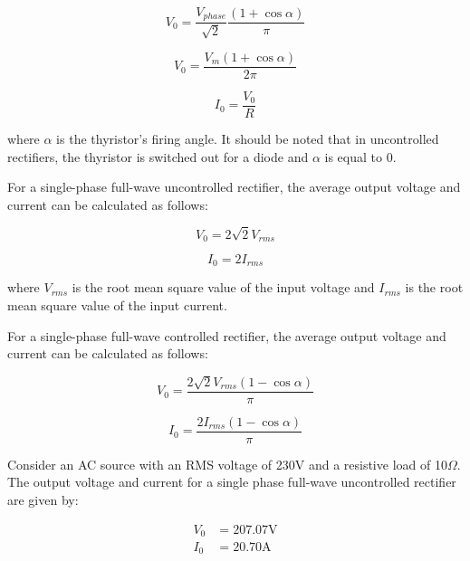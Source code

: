 \begin{equation}
    V_0 = \frac{V_{phase}}{\sqrt{2}}\frac{(1+\cos\alpha)}{\pi}
\end{equation}

\begin{equation}
    V_0 = \frac{V_m(1+\cos\alpha)}{2\pi}
\end{equation}

\begin{equation}
    I_0 = \frac{V_0}{R}
\end{equation}

where $\alpha$ is the thyristor's firing angle. It should be noted that in uncontrolled rectifiers, the thyristor is switched out for a diode and $\alpha$ is equal to 0.

For a single-phase full-wave uncontrolled rectifier, the average output voltage and current can be calculated as follows:

\begin{equation}
    V_0 = 2\sqrt{2}V_{rms}
\end{equation}

\begin{equation}
    I_0 = 2I_{rms}
\end{equation}

where $V_{rms}$ is the root mean square value of the input voltage and $I_{rms}$ is the root mean square value of the input current.

For a single-phase full-wave controlled rectifier, the average output voltage and current can be calculated as follows:

\begin{equation}
    V_0 = \frac{2\sqrt{2}V_{rms}(1-\cos\alpha)}{\pi}
\end{equation}

\begin{equation}
    I_0 = \frac{2I_{rms}(1-\cos\alpha)}{\pi}
\end{equation}

Consider an AC source with an RMS voltage of 230V and a resistive load of 10$ \Omega $. The output voltage and current for a single phase full-wave uncontrolled rectifier are given by:

\begin{align}
    V_{0} & = 207.07\mathrm{V} \\
    I_{0} & = 20.70\mathrm{A}
\end{align}


